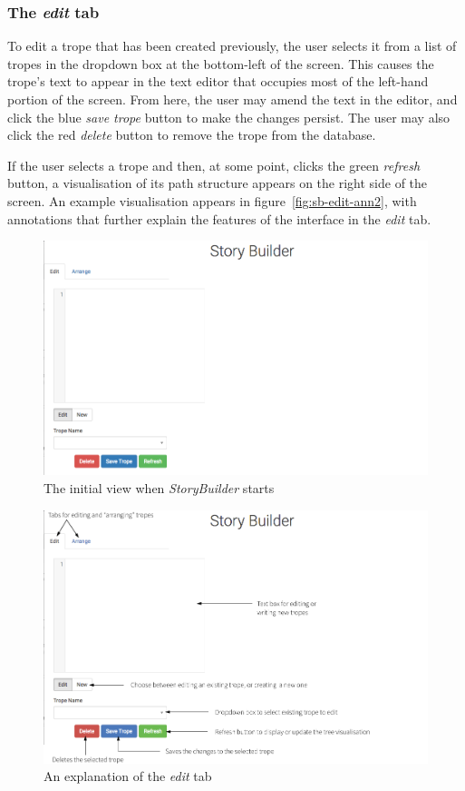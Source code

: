 \documentclass[11pt]{report}
\begin{document}
\subsubsection{The \emph{edit} tab}
To edit a trope that has been created previously, the user selects it from a
list of tropes in the dropdown box at the bottom-left of the screen. This causes
the trope's text to appear in the text editor that occupies most of the
left-hand portion of the screen. From here, the user may amend the text in the
editor, and click the blue \emph{save trope} button to make the changes persist.
The user may also click the red \emph{delete} button to remove the trope from
the database.

If the user selects a trope and then, at some point, clicks the green
\emph{refresh} button, a visualisation of its path structure appears on the
right side of the screen. An example visualisation appears in
figure~\ref{fig:sb-edit-ann2}, with annotations that further explain the features
of the interface in the \emph{edit} tab.

\begin{figure}[!t]
\centerline{\includegraphics[width=\textwidth]{storybuilder5.png}}
\caption{The initial view when \emph{StoryBuilder} starts}\label{fig:sb-start}
\end{figure}

\begin{figure}[!t]
\centerline{\includegraphics[width=\textwidth]{storybuilder-a1.png}}
\caption{An explanation of the \emph{edit} tab}\label{fig:sb-edit-ann}
\end{figure}
\end{document}
